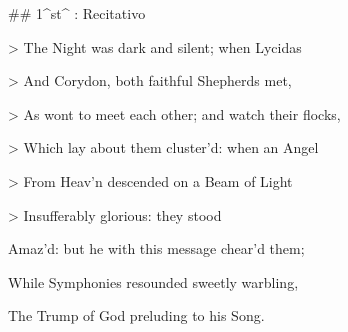 ## 1^st^ \mvmt: Recitativo

\beginnumbering
\pstart
> The Night was dark and silent; when Lycidas \ledsidenote{Lycidas and Corydon are stock classical characters. [@}

> And Corydon, both faithful Shepherds met, 

> As wont to meet each other; and watch their flocks, 

> Which lay about them cluster’d: when an Angel 

> From Heav’n descended on a Beam of Light 

> Insufferably glorious: they stood 

Amaz’d: but he with this message chear’d them; 

While Symphonies resounded sweetly warbling, 

The Trump of God preluding to his Song.
\pend
\endnumbering
